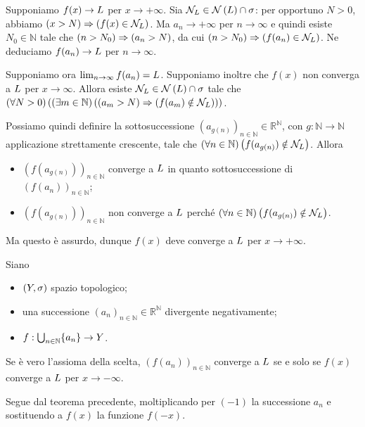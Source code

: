 \Proof Supponiamo $f(x) \rightarrow L$ per $x \rightarrow +\infty$. Sia $\Neighborhood_\Limit \in \Neighborhoods{\Limit} \cap \VarTopology$: per opportuno $N > 0$, abbiamo $\left ( x > N \right ) \Rightarrow \left ( f(x) \in \mathcal{N}_L \right )$. Ma $a_n \rightarrow +\infty$ per $n \rightarrow \infty$ e quindi esiste $N_0 \in \mathbb{N}$ tale che $\left ( n > N_0 \right ) \Rightarrow \left ( a_n > N \right )$, da cui $\left ( n > N_0 \right ) \Rightarrow \left ( f(a_n) \in \mathcal{N}_L \right )$. Ne deduciamo $f(a_n) \rightarrow L$ per $n \rightarrow \infty$.
\par Supponiamo ora $\lim_{n \rightarrow \infty} f(a_n) = L$. Supponiamo inoltre che $f(x)$ non converga a $L$ per $x \rightarrow \infty$. Allora esiste $\Neighborhood_\Limit \in \Neighborhoods{\Limit} \cap \VarTopology$ tale che $\left ( \forall N > 0 \right ) \left ( \left ( \exists m \in \mathbb{N} \right ) \left ( \left ( a_m > N \right ) \Rightarrow \left ( f(a_m) \notin \mathcal{N}_L \right ) \right ) \right )$.
\par Possiamo quindi definire la sottosuccessione $(a_{g(n)})_{n \in \mathbb{N}} \in \mathbb{R}^{\mathbb{N}}$, con $g: \mathbb{N} \rightarrow \mathbb{N}$ applicazione strettamente crescente, tale che $\left ( \forall n \in \mathbb{N} \right ) \left ( f(a_{g(n)}) \notin \mathcal{N}_L \right )$. Allora
\begin{itemize}
	\item $(f(a_{g(n)}))_{n \in \mathbb{N}}$ converge a $L$ in quanto sottosuccessione di $(f(a_n))_{n \in \mathbb{N}}$;
	\item $(f(a_{g(n)}))_{n \in \mathbb{N}}$ non converge a $L$ perch\'e $\left ( \forall n \in \mathbb{N} \right ) \left ( f(a_{g(n)}) \notin \mathcal{N}_L \right )$.
\end{itemize}
Ma questo \`e assurdo, dunque $f(x)$ deve converge a $L$ per $x \rightarrow +\infty$. \EndProof
\begin{Corollary}
	Siano
	\begin{itemize}
		\item $(Y,\sigma)$ spazio topologico;
		\item una successione $(a_n)_{n \in \mathbb{N}} \in \mathbb{R}^\mathbb{N}$ divergente negativamente;
		\item $f: \bigcup_{n \in \mathbb{N}} \lbrace a_n \rbrace \rightarrow Y$.
	\end{itemize}
	Se \`e vero l'assioma della scelta, $(f(a_n))_{n \in \mathbb{N}}$ converge a $L$ se e solo se $f(x)$ converge a $L$ per $x \rightarrow -\infty$.
\end{Corollary}
\Proof Segue dal teorema precedente, moltiplicando per $(-1)$ la successione $a_n$ e sostituendo a $f(x)$ la funzione $f(-x)$. \EndProof
